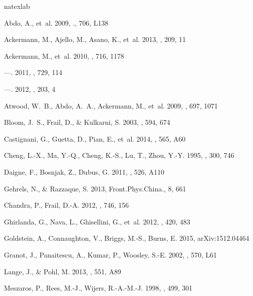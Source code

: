 \documentclass[manuscript]{aastex}
\begin{document}
\begin{thebibliography}{}
\expandafter\ifx\csname natexlab\endcsname\relax\def\natexlab#1{#1}\fi

Abdo, A., {et~al.} 2009, \apj., 706, L138

Ackermann, M., Ajello, M., Asano, K., {et~al.} 2013, \apjs, 209,
  11

Ackermann, M., {et~al.} 2010, \apj, 716, 1178

---. 2011, \apj, 729, 114

---. 2012, \apjs, 203, 4

{Atwood}, W.~B., {Abdo}, A.~A., {Ackermann}, M., {et~al.} 2009, \apj,
  697, 1071

Bloom, J.~S., Frail, D., \& Kulkarni, S. 2003, \apj, 594, 674

Castignani, G., Guetta, D., Pian, E., {et~al.} 2014, \aap, 565,
  A60

Cheng, L.-X., Ma, Y.-Q., Cheng, K.-S., Lu, T., Zhou, Y.-Y. 1995, \aap, 300, 746

Daigne, F., Bosnjak, Z., Dubus, G. 2011, \aap, 526, A110

Gehrels, N., \& Razzaque, S. 2013, Front.Phys.China., 8, 661

Chandra, P., Frail, D.-A. 2012, \apj, 746, 156

Ghirlanda, G., Nava, L., Ghisellini, G., {et~al.} 2012,
  \mnras, 420, 483

Goldstein, A., Connaughton, V., Briggs, M.-S., Burns, E. 2015, arXiv:1512.04464

Granot, J., Panaitescu, A., Kumar, P., Woosley, S.-E. 2002, \apjl, 570, L61

Lange, J., \& Pohl, M. 2013, \aap, 551, A89

Meszaros, P., Rees, M.-J., Wijers, R.-A.-M.-J. 1998, \apj, 499, 301


\end{thebibliography}
\end{document}
